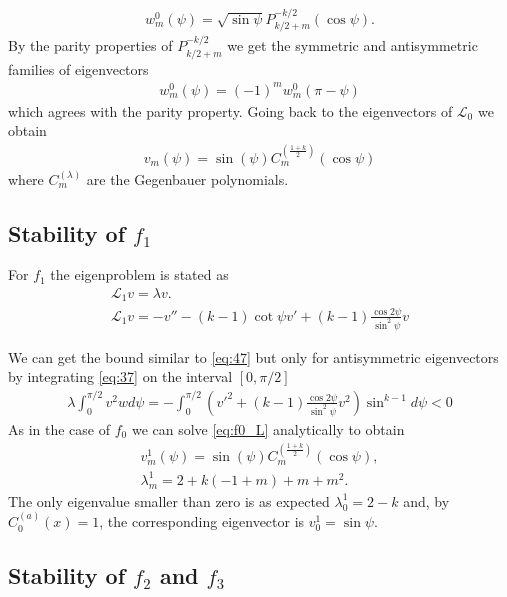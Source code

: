 \begin{align}
  \label{eq:11}
  w_m^0(\psi)=\sqrt{\sin\psi}P_{k/2+m}^{-k/2}(\cos\psi).
\end{align}
By the parity properties of $P_{k/2+m}^{-k/2}$ we get the symmetric
and antisymmetric families of eigenvectors
\begin{align}
  \label{eq:44}
  w_m^0(\psi)=(-1)^m w_m^0(\pi-\psi)
\end{align}
which agrees with the parity property. Going back to the eigenvectors
of $\mathcal{L}_0$ we obtain
\begin{align}
  \label{eq:45}
  v_m(\psi)=\sin(\psi)C^{\left(\frac{1+k}{2}\right)}_m(\cos\psi)
\end{align}
where $C^{(\lambda)}_m$ are the Gegenbauer polynomials.

\subsection{Stability of $f_1$}
\label{sec:stability-f_1}

For $f_1$ the eigenproblem is stated as
\begin{align}
  \label{eq:f0_L}
  \mathcal{L}_1 v = \lambda v. \\
  \label{eq:37}
  \mathcal{L}_1 v = -v''-(k-1)\cot\psi v'+(k-1)\frac{\cos2\psi}{\sin^2\psi}v
\end{align}

We can get the bound similar to \eqref{eq:47} but only for
antisymmetric eigenvectors by integrating \eqref{eq:37} on the
interval $[0,\pi/2]$
\begin{align}
  \label{eq:f1_lambda}
  \lambda\int_0^{\pi/2} v^2w
  d\psi=-\int_0^{\pi/2}\left(v'^2+(k-1)\frac{\cos2\psi}{\sin^2\psi}v^2\right)\sin^{k-1}d\psi<0
\end{align}
As in the case of $f_0$ we can solve \eqref{eq:f0_L} analytically to
obtain
\begin{align}
  \label{eq:48}
  v_m^1(\psi)=\sin(\psi)C^{\left(\frac{1+k}{2}\right)}_m(\cos\psi), \\
  \label{eq:49}
  \lambda_m^1=2 + k (-1 + m) + m + m^2.
\end{align}
The only eigenvalue smaller than zero is as expected $\lambda_0^1=2-k$
and, by $C^{(a)}_0(x)=1$, the corresponding eigenvector is
$v_0^1=\sin\psi$.

\subsection{Stability of $f_2$ and $f_3$}
\label{sec:stability-f_2-f_3}

